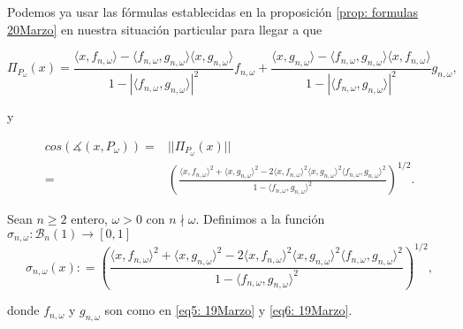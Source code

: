 Podemos ya usar las fórmulas establecidas
en la proposición \ref{prop: formulas 20Marzo}
en nuestra situación particular para llegar a que

\[
 \Pi_{P_{\omega}}(x) = 
\frac{
\langle x, f_{n, \omega} \rangle - \langle f_{n, \omega}, g_{n, \omega} \rangle 
\langle x, g_{n, \omega} \rangle
}
{1-|\langle f_{n, \omega}, g_{n, \omega} \rangle |^{2}  }
f_{n, \omega} +
\frac{
\langle x, g_{n, \omega} \rangle - \langle f_{n, \omega}, g_{n, \omega} \rangle 
\langle x, f_{n, \omega} \rangle
}
{1-|\langle f_{n, \omega}, g_{n, \omega} \rangle |^{2}  }
g_{n, \omega},
\]

\noindent
y


\begin{align*}
cos (\measuredangle (x, P_{\omega})) = & || \Pi_{P_{\omega}}(x) ||  \\
= & 
\left(		  
		  \frac{\langle x, f_{n, \omega } \rangle^{2} +  \langle x, g_{n, \omega } \rangle^{2}	
	       -2  \langle x, f_{n, \omega } \rangle^{2} \langle x, g_{n, \omega } \rangle^{2} \langle f_{n, \omega }, g_{n, \omega } \rangle^{2}}{1- \langle f_{n, \omega }, g_{n, \omega } \rangle^{2}}	  
\right) ^{1/2}.
\end{align*}


\begin{defi}
Sean $n \geq 2$ entero, $\omega >0$ con $n \nmid \omega$.
Definimos a la función $\sigma_{n , \omega}: \mathcal{B}_{n}(1) \longrightarrow [0,1]$
\begin{equation}
\label{eq: def sigmas}
\sigma_{n, \omega}(x) : = 
\left(	
\frac{\langle x, f_{n, \omega } \rangle^{2} +  \langle x, g_{n, \omega } \rangle^{2}	
	       -2  \langle x, f_{n, \omega } \rangle^{2} \langle x, g_{n, \omega } \rangle^{2} \langle f_{n, \omega }, g_{n, \omega } \rangle^{2}}{1- \langle f_{n, \omega }, g_{n, \omega } \rangle^{2}}	  
 \right) ^{1/2},
\end{equation}

\noindent
donde $f_{n, \omega}$ y $g_{n, \omega}$ son como en 
\eqref{eq5: 19Marzo} y \eqref{eq6: 19Marzo}.
\end{defi}


